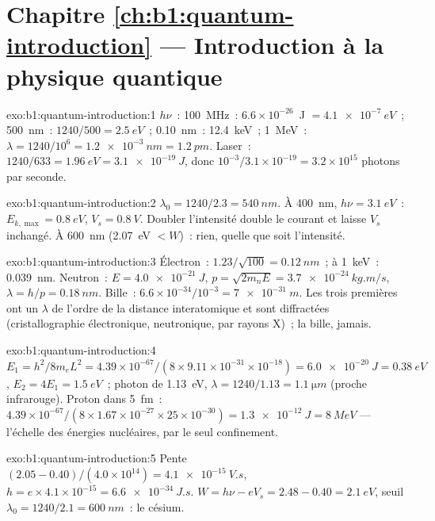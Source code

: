 \section*{Chapitre \ref{ch:b1:quantum-introduction} --- Introduction à la physique quantique}

\begin{solution}{exo:b1:quantum-introduction:1}
$h\nu$~: \qty{100}{MHz}~: $6.6 \times 10^{-26}$~J $= \qty{4.1e-7}{eV}$~; \qty{500}{nm}~:
$1240/500 = \qty{2.5}{eV}$~; \qty{0.10}{nm}~: \qty{12.4}{keV}~; \qty{1}{MeV}~: $\lambda =
1240/10^6 = \qty{1.2e-3}{nm} = \qty{1.2}{pm}$. Laser~: $1240/633 = \qty{1.96}{eV} =
\qty{3.1e-19}{J}$, donc $10^{-3}/3.1 \times 10^{-19} = 3.2 \times 10^{15}$ photons par
seconde.
\end{solution}

\begin{solution}{exo:b1:quantum-introduction:2}
$\lambda_0 = 1240/2.3 = \qty{540}{nm}$. À \qty{400}{nm}, $h\nu = \qty{3.1}{eV}$~:
$E_{k,\max} = \qty{0.8}{eV}$, $V_s = \qty{0.8}{V}$. Doubler l'intensité
double le courant et laisse $V_s$ inchangé. À \qty{600}{nm}
(\qty{2.07}{eV} $< W$)~: rien, quelle que soit l'intensité.
\end{solution}

\begin{solution}{exo:b1:quantum-introduction:3}
Électron~: $1.23/\sqrt{100} = \qty{0.12}{nm}$~; à \qty{1}{keV}~: \qty{0.039}{nm}.
Neutron~: $E = \qty{4.0e-21}{J}$, $p = \sqrt{2m_nE} = \qty{3.7e-24}{kg.m/s}$,
$\lambda = h/p = \qty{0.18}{nm}$. Bille~: $6.6 \times 10^{-34}/10^{-3} = \qty{7e-31}{m}$.
Les trois premières ont un $\lambda$ de l'ordre de la distance interatomique et
sont diffractées (cristallographie électronique, neutronique, par rayons X)~;
la bille, jamais.
\end{solution}

\begin{solution}{exo:b1:quantum-introduction:4}
$E_1 = h^2/8m_eL^2 = 4.39 \times 10^{-67}/(8 \times 9.11 \times 10^{-31} \times 10^{-18}) =
\qty{6.0e-20}{J} = \qty{0.38}{eV}$, $E_2 = 4E_1 = \qty{1.5}{eV}$~; photon de
\qty{1.13}{eV}, $\lambda = 1240/1.13 = \qty{1.1}{\micro m}$ (proche infrarouge). Proton
dans \qty{5}{fm}~: $4.39 \times 10^{-67}/(8 \times 1.67 \times 10^{-27} \times 25 \times 10^{-30}) =
\qty{1.3e-12}{J} = \qty{8}{MeV}$ --- l'échelle des énergies nucléaires, par le
seul confinement.
\end{solution}

\begin{solution}{exo:b1:quantum-introduction:5}
Pente $(2.05 - 0.40)/(4.0 \times 10^{14}) = \qty{4.1e-15}{V.s}$, $h = e \times 4.1 \times
10^{-15} = \qty{6.6e-34}{J.s}$. $W = h\nu - eV_s = 2.48 - 0.40 = \qty{2.1}{eV}$,
seuil $\lambda_0 = 1240/2.1 = \qty{600}{nm}$~: le césium.
\end{solution}

